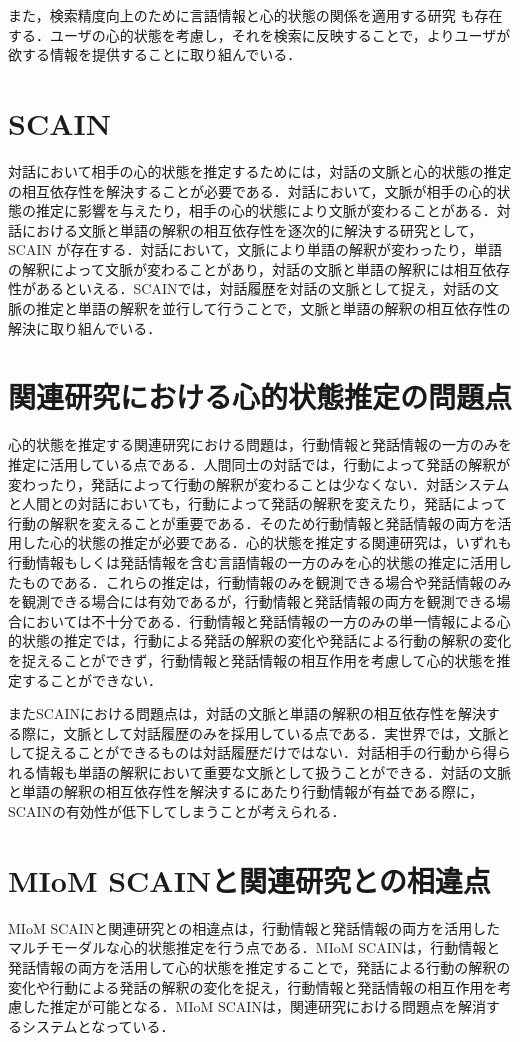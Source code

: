 \par
また，検索精度向上のために言語情報と心的状態の関係を適用する研究 \cite{10.1007/978-3-642-02481-8_4}も存在する．ユーザの心的状態を考慮し，それを検索に反映することで，よりユーザが欲する情報を提供することに取り組んでいる．

\section{SCAIN}
対話において相手の心的状態を推定するためには，対話の文脈と心的状態の推定の相互依存性を解決することが必要である．対話において，文脈が相手の心的状態の推定に影響を与えたり，相手の心的状態により文脈が変わることがある．対話における文脈と単語の解釈の相互依存性を逐次的に解決する研究として，SCAIN \cite{takimoto2020slaminspired}が存在する．対話において，文脈により単語の解釈が変わったり，単語の解釈によって文脈が変わることがあり，対話の文脈と単語の解釈には相互依存性があるといえる．SCAINでは，対話履歴を対話の文脈として捉え，対話の文脈の推定と単語の解釈を並行して行うことで，文脈と単語の解釈の相互依存性の解決に取り組んでいる．

\section{関連研究における心的状態推定の問題点}
\par
心的状態を推定する関連研究における問題は，行動情報と発話情報の一方のみを推定に活用している点である．人間同士の対話では，行動によって発話の解釈が変わったり，発話によって行動の解釈が変わることは少なくない．対話システムと人間との対話においても，行動によって発話の解釈を変えたり，発話によって行動の解釈を変えることが重要である．そのため行動情報と発話情報の両方を活用した心的状態の推定が必要である．心的状態を推定する関連研究は，いずれも行動情報もしくは発話情報を含む言語情報の一方のみを心的状態の推定に活用したものである．これらの推定は，行動情報のみを観測できる場合や発話情報のみを観測できる場合には有効であるが，行動情報と発話情報の両方を観測できる場合においては不十分である．行動情報と発話情報の一方のみの単一情報による心的状態の推定では，行動による発話の解釈の変化や発話による行動の解釈の変化を捉えることができず，行動情報と発話情報の相互作用を考慮して心的状態を推定することができない．

\par
またSCAINにおける問題点は，対話の文脈と単語の解釈の相互依存性を解決する際に，文脈として対話履歴のみを採用している点である．実世界では，文脈として捉えることができるものは対話履歴だけではない．対話相手の行動から得られる情報も単語の解釈において重要な文脈として扱うことができる．対話の文脈と単語の解釈の相互依存性を解決するにあたり行動情報が有益である際に，SCAINの有効性が低下してしまうことが考えられる．

\section{MIoM SCAINと関連研究との相違点}
\par
MIoM SCAINと関連研究との相違点は，行動情報と発話情報の両方を活用したマルチモーダルな心的状態推定を行う点である．MIoM SCAINは，行動情報と発話情報の両方を活用して心的状態を推定することで，発話による行動の解釈の変化や行動による発話の解釈の変化を捉え，行動情報と発話情報の相互作用を考慮した推定が可能となる．MIoM SCAINは，関連研究における問題点を解消するシステムとなっている．
